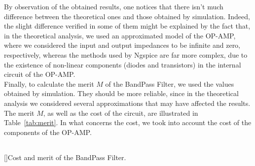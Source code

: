 \vspace{10mm}

By observation of the obtained results, one notices that there isn't much difference between the theoretical ones and those obtained by simulation. Indeed, the slight difference verified in some of them might be explained by the fact that, in the theoretical analysis, we used an approximated model of the OP-AMP, where we considered the input and output impedances to be infinite and zero, respectively, whereas the methods used by Ngspice are far more complex, due to the existence of non-linear components (diodes and transistors) in the internal circuit of the OP-AMP.\\

Finally, to calculate the merit $M$ of the BandPass Filter, we used the values obtained by simulation. They should be more reliable, since in the theoretical analysis we considered several approximations that may have affected the results. The merit $M$, as well as the cost of the circuit, are illustrated in Table~\ref{tab:merit}. In what concerns the cost, we took into account the cost of the components of the OP-AMP.

\vspace{2mm}

\begin{center}
\begin{tabular}{ | c | c | }\hline
 
\end{tabular}
[]{Cost and merit of the BandPass Filter.}
\label{tab:merit}
\end{center}
